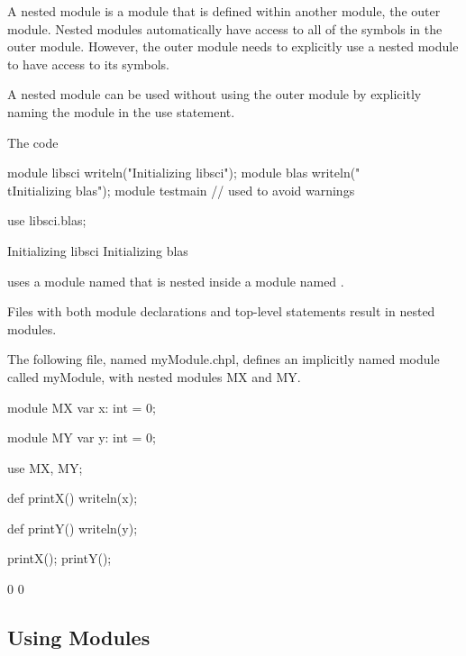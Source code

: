 A nested module is a module that is defined within another module, the
outer module.  Nested modules automatically have access to all of the
symbols in the outer module.  However, the outer module needs to
explicitly use a nested module to have access to its symbols.

A nested module can be used without using the outer module by
explicitly naming the module in the use statement.
\begin{example}
The code
\begin{chapelpre}
module libsci {
  writeln("Initializing libsci");
  module blas {
    writeln("\\tInitializing blas");
  }
}
module testmain { // used to avoid warnings
}
\end{chapelpre}
\begin{chapel}
use libsci.blas;
\end{chapel}
\begin{chapeloutput}
Initializing libsci
	Initializing blas
\end{chapeloutput}
uses a module named  that is nested inside a module
named .
\end{example}

Files with both module declarations and top-level statements result in
nested modules.

\begin{example}
The following file, named myModule.chpl, defines an
implicitly named module called myModule, with nested modules
MX and MY.
\begin{chapelpre}
\end{chapelpre}
\begin{chapel}
module MX {
  var x: int = 0;
}

module MY {
  var y: int = 0;
}

use MX, MY;

def printX() {
  writeln(x);
}

def printY() {
  writeln(y);
}
\end{chapel}
\begin{chapelpost}
printX();
printY();
\end{chapelpost}
\begin{chapeloutput}
0
0
\end{chapeloutput}
\end{example}


\subsection{Using Modules}
\label{Using_Modules}

